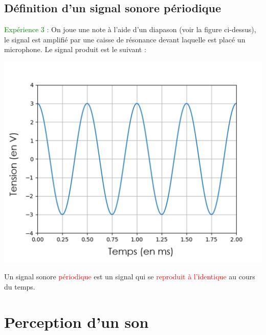 \subsection{Définition d'un signal sonore périodique}
\textcolor{green}{Expérience 3 :} On joue une note à l'aide d'un diapason (voir la figure ci-dessus), le signal est amplifié par une caisse de résonance devant laquelle est placé un microphone. Le signal produit est le suivant :
\begin{center}
    \includegraphics[scale=0.5]{Images/Chapitre_3/Signal_diapason.PNG}
\end{center}
\begin{tcolorbox}
[colback=green!5!white,colframe=green!75!black,title=\textbf{Signal périodique :}]
Un signal sonore \textcolor{red}{périodique} est un signal qui se \textcolor{red}{reproduit à l'identique} au cours du temps. 
\end{tcolorbox}

\section{Perception d'un son}